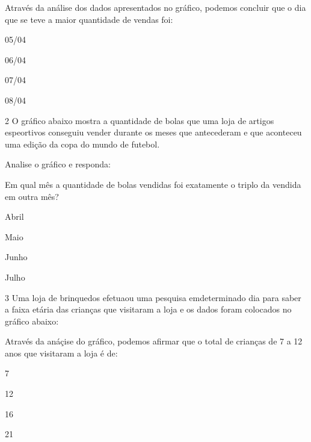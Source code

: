 
Através da análise dos dados apresentados no gráfico, podemos concluir
que o dia que se teve a maior quantidade de vendas foi:

\begin{escolha}
\item
  05/04
\item
  06/04
\item
  07/04
\item
  08/04
\end{escolha}


\num{2} O gráfico abaixo mostra a quantidade de bolas que uma loja de
artigos espeortivos conseguiu vender durante os meses que antecederam e
que aconteceu uma edição da copa do mundo de futebol.


Analise o gráfico e responda:

Em qual mês a quantidade de bolas vendidas foi exatamente o triplo da
vendida em outra mês?

\begin{escolha}
\item
  Abril
\item
  Maio
\item
  Junho
\item
  Julho
\end{escolha}


\num{3} Uma loja de brinquedos efetuaou uma pesquisa emdeterminado dia para
saber a faixa etária das crianças que visitaram a loja e os dados foram
colocados no gráfico abaixo:


Através da anáçise do gráfico, podemos afirmar que o total de crianças
de 7 a 12 anos que visitaram a loja é de:

\begin{escolha}
\item
  7
\item
  12
\item
  16
\item
  21
\end{escolha}

